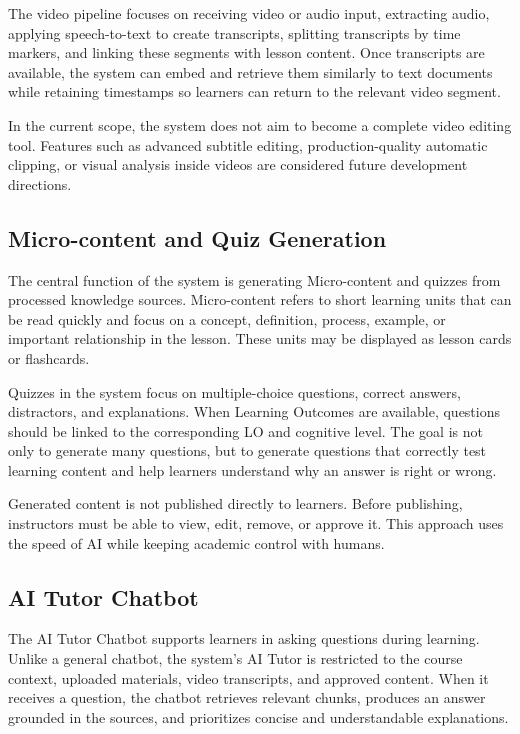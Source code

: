 The video pipeline focuses on receiving video or audio input, extracting
audio, applying speech-to-text to create transcripts, splitting transcripts by
time markers, and linking these segments with lesson content. Once transcripts
are available, the system can embed and retrieve them similarly to text
documents while retaining timestamps so learners can return to the relevant
video segment.

In the current scope, the system does not aim to become a complete video
editing tool. Features such as advanced subtitle editing, production-quality
automatic clipping, or visual analysis inside videos are considered future
development directions.

\subsection{Micro-content and Quiz Generation}

The central function of the system is generating Micro-content and quizzes from
processed knowledge sources. Micro-content refers to short learning units that
can be read quickly and focus on a concept, definition, process, example, or
important relationship in the lesson. These units may be displayed as lesson
cards or flashcards.

Quizzes in the system focus on multiple-choice questions, correct answers,
distractors, and explanations. When Learning Outcomes are available, questions
should be linked to the corresponding LO and cognitive level. The goal is not
only to generate many questions, but to generate questions that correctly test
learning content and help learners understand why an answer is right or wrong.

Generated content is not published directly to learners. Before publishing,
instructors must be able to view, edit, remove, or approve it. This approach
uses the speed of AI while keeping academic control with humans.

\subsection{AI Tutor Chatbot}

The AI Tutor Chatbot supports learners in asking questions during learning.
Unlike a general chatbot, the system's AI Tutor is restricted to the course
context, uploaded materials, video transcripts, and approved content. When it
receives a question, the chatbot retrieves relevant chunks, produces an answer
grounded in the sources, and prioritizes concise and understandable
explanations.

